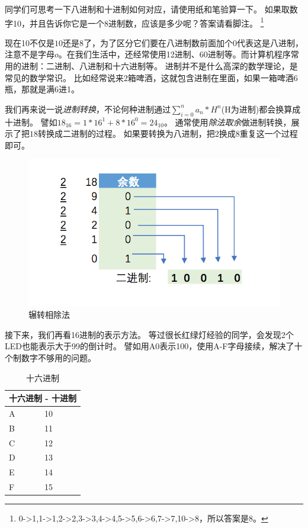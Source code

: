 同学们可思考一下八进制和十进制如何对应，请使用纸和笔验算一下。
如果取数字10，并且告诉你它是一个8进制数，应该是多少呢？答案请看脚注。
\footnote{0->1,1->1,2->2,3->3,4->4,5->5,6->6,7->7,10->8，所以答案是8。}

现在10不仅是$10$还是$8$了，为了区分它们要在八进制数前面加个$0$代表这是八进制，注意不是字母$o$。在我们生活中，还经常使用12进制、60进制等。而计算机程序常用的进制：二进制、八进制和十六进制等。
进制并不是什么高深的数学理论，是常见的数学常识。
比如经常说来2箱啤酒，这就包含进制在里面，如果一箱啤酒6瓶，那就是满6进1。

我们再来说一说\emph{进制转换}，不论何种进制通过$\sum_{i=0}^n a_n*H^n$(H为进制)都会换算成十进制。
譬如$18_{16} = 1*16^1+8*16^0 = 24_{10}$。
通常使用\emph{除法取余}做进制转换，展示了把$18$转换成二进制的过程。
如果要转换为八进制，把2换成8重复这一个过程即可。

\begin{figure}[!htb]
\centerline{\includegraphics[width=.3\figwidth]{images/eu_alg.png}}
\label{fig:part1_eu_alg}
\caption{辗转相除法}
\end{figure}

接下来，我们再看16进制的表示方法。
等过很长红绿灯经验的同学，会发现2个LED也能表示大于99的倒计时。
譬如用A0表示100，使用A-F字母接续，解决了十个制数字不够用的问题。

\begin{table}[!htbp]\centering
\begin{tabular}{|p{5cm}|p{5cm}|}
\hline
\multicolumn{2}{|c|}{十六进制 - 十进制}\\
\hline
A&10\\B&11\\C&12\\D&13\\E&14\\F&15\\
\hline
\end{tabular}
\caption{十六进制}
\label{table:part1_hex_to_dec}
\end{table}

